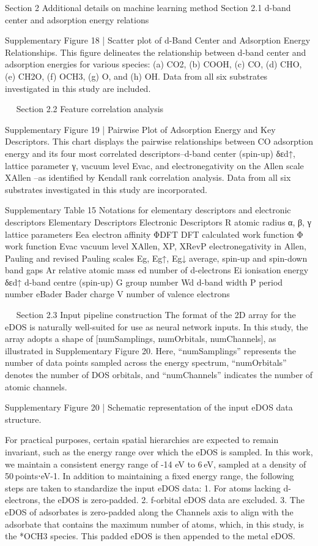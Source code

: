 Section 2 Additional details on machine learning method
Section 2.1 d-band center and adsorption energy relations


Supplementary Figure 18 | Scatter plot of d-Band Center and Adsorption Energy Relationships. This figure delineates the relationship between d-band center and adsorption energies for various species: (a) CO2, (b) COOH, (c) CO, (d) CHO, (e) CH2O, (f) OCH3, (g) O, and (h) OH. Data from all six substrates investigated in this study are included.


 
Section 2.2 Feature correlation analysis


Supplementary Figure 19 | Pairwise Plot of Adsorption Energy and Key Descriptors. This chart displays the pairwise relationships between CO adsorption energy and its four most correlated descriptors–d-band center (spin-up) δεd↑, lattice parameter γ, vacuum level Evac, and electronegativity on the Allen scale XAllen –as identified by Kendall rank correlation analysis. Data from all six substrates investigated in this study are incorporated.


Supplementary Table 15
Notations for elementary descriptors and electronic descriptors
Elementary Descriptors	Electronic Descriptors
R	atomic radius	α, β, γ	lattice parameters
Eea	electron affinity	ΦDFT	DFT calculated work function
Φ	work function	Evac	vacuum level
XAllen, ΧP, ΧRevP	electronegativity in Allen, Pauling and revised Pauling scales	Eg, Eg↑, Eg↓	average, spin-up and spin-down band gaps
Ar	relative atomic mass	ed	number of d-electrons
Ei	ionisation energy	δεd↑	d-band centre (spin-up)
G	group number	Wd	d-band width
P	period number	eBader	Bader charge
V	number of valence electrons


 
Section 2.3 Input pipeline construction
The format of the 2D array for the eDOS is naturally well-suited for use as neural network inputs. In this study, the array adopts a shape of [numSamplings, numOrbitals, numChannels], as illustrated in Supplementary Figure 20. Here, “numSamplings” represents the number of data points sampled across the energy spectrum, “numOrbitals” denotes the number of DOS orbitals, and “numChannels” indicates the number of atomic channels.


Supplementary Figure 20 | Schematic representation of the input eDOS data structure.

For practical purposes, certain spatial hierarchies are expected to remain invariant, such as the energy range over which the eDOS is sampled. In this work, we maintain a consistent energy range of -14 eV to 6 eV, sampled at a density of 50 points⋅eV-1. In addition to maintaining a fixed energy range, the following steps are taken to standardize the input eDOS data:
1.	For atoms lacking d-electrons, the eDOS is zero-padded.
2.	f-orbital eDOS data are excluded.
3.	The eDOS of adsorbates is zero-padded along the Channels axis to align with the adsorbate that contains the maximum number of atoms, which, in this study, is the *OCH3 species. This padded eDOS is then appended to the metal eDOS.

